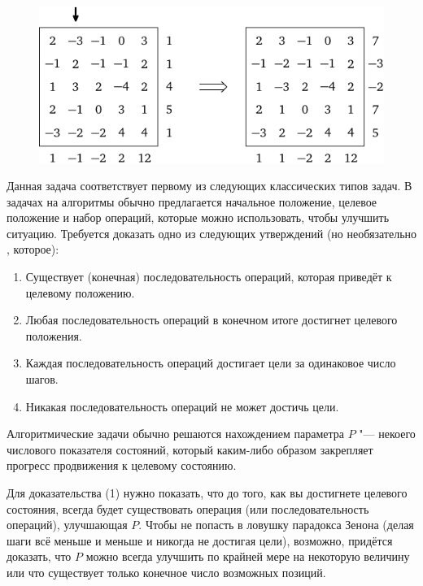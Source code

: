 \documentclass[twoside]{book}
\begin{document}
\begin{figure}
\centering
\includegraphics{mp/wink-16}
\end{figure}


Данная задача соответствует первому из следующих классических типов задач.
В задачах на алгоритмы обычно предлагается начальное положение, целевое положение и набор операций, которые можно использовать, чтобы улучшить ситуацию.
Требуется доказать одно из следующих утверждений (но необязательно , которое):
\begin{enumerate}[label=(\arabic*),noitemsep,leftmargin=\parindent,labelsep=3.5pt]
\item Существует (конечная) последовательность операций, которая приведёт к целевому положению.
\item Любая последовательность операций в конечном итоге достигнет целевого положения.
\item Каждая последовательность операций достигает цели за одинаковое число шагов.
\item Никакая последовательность операций не может достичь цели.
\end{enumerate}

Алгоритмические задачи обычно решаются нахождением параметра $P$ "--- некоего числового показателя состояний, который каким-либо образом закрепляет прогресс продвижения к целевому состоянию.

Для доказательства  (1) нужно показать, что до того, как вы достигнете целевого состояния, всегда будет существовать операция (или последовательность операций), улучшающая $P$.
Чтобы не попасть в ловушку парадокса Зенона (делая шаги всё меньше и меньше и никогда не достигая цели), возможно, придётся доказать, что $P$ можно всегда улучшить по крайней мере на некоторую величину или что существует только конечное число возможных позиций.
\end{document}
